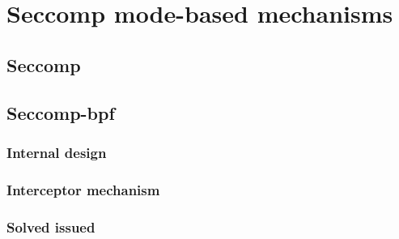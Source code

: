 \chapter{Seccomp mode-based mechanisms}

\section{Seccomp}
\section{Seccomp-bpf}
\subsection{Internal design}
\subsection{Interceptor mechanism}
\subsection{Solved issued}


